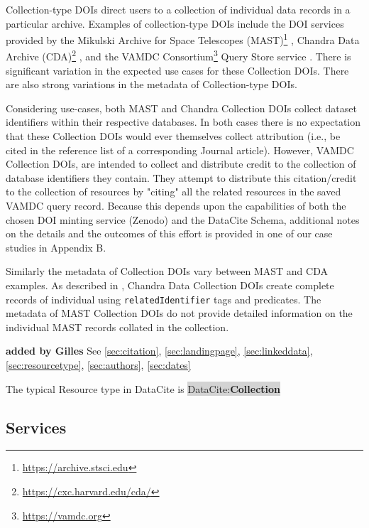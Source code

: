 \documentclass[11pt,a4paper]{ivoa}
\newcommand{\dataciteterm}[1]{\colorbox{lightgray}{DataCite:\textbf{#1}}}
\begin{document}
Collection-type DOIs direct users to a collection of individual data records in a particular archive.
Examples of collection-type DOIs include the DOI services provided by the Mikulski Archive for Space Telescopes (MAST)\footnote{\url{https://archive.stsci.edu}} \citep{2018ApJS..236...20N}, Chandra Data Archive (CDA)\footnote{\url{https://cxc.harvard.edu/cda/}} \citep{2018EPJWC.18612011R}, and the VAMDC Consortium\footnote{\url{https://vamdc.org}} Query Store service \citep{2018Galax...6..105M}.  
There is significant variation in the expected use cases for these Collection DOIs. 
There are also strong variations in the metadata of Collection-type DOIs.

Considering use-cases, both MAST and Chandra Collection DOIs collect dataset identifiers within their respective databases.
In both cases there is no expectation that these Collection DOIs would ever themselves collect attribution (i.e., be cited in the reference list of a corresponding Journal article).
However, VAMDC Collection DOIs, are intended to collect and distribute credit to the collection of database identifiers they contain.
They attempt to distribute this citation/credit to the collection of resources by "citing" all the related resources in the saved VAMDC query record.
Because this depends upon the capabilities of both the chosen DOI minting service (Zenodo) and the DataCite Schema, additional notes on the details and the outcomes of this effort is provided in one of our case studies in Appendix B. 

Similarly the metadata of Collection DOIs vary between MAST and CDA examples. 
As described in \citet{2023ChNew..34....5D}, Chandra Data Collection DOIs create complete records of individual using \texttt{relatedIdentifier} tags and predicates. 
The metadata of MAST Collection DOIs do not provide detailed information on the individual MAST records collated in the collection.


\textbf{\color{red} added by Gilles}
See \ref{sec:citation}, \ref{sec:landingpage}, \ref{sec:linkeddata}, \ref{sec:resourcetype}, \ref{sec:authors}, \ref{sec:dates}

The typical Resource type in DataCite is \dataciteterm{Collection}

\subsection{Services}
\label{sec:intro:services}
\end{document}
